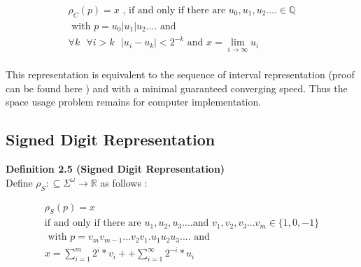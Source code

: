\documentclass[12pt,twoside,notitlepage]{report}
\begin{document}
\begin{equation}
\begin{split}
\rho _{\textit{C}} (p) = \textit{x} \mbox{ , if and only if there are }u_{0} , u_{1} , u_{2} .... \in \mathbb{Q} \\
\mbox{ with } p = u_{0}|u_{1}|u_{2}....  \mbox{ and } \\
\forall k \mbox{ } \forall \textit{i} >k \mbox{ } |u_{\textit{i}}-u_{\textit{k}}| < 2^{-k} \mbox{ and } \textit{x} = \lim_{\textit{i}\to\infty} u_{\textit{i}} 
\end{split}
\end{equation}\\
This representation is equivalent to the sequence of interval representation (proof can be found here \cite{weihrauchd}) and with a minimal guaranteed converging speed. Thus the space usage problem remains for computer implementation. 


\subsection {Signed Digit Representation}
\textbf{Definition 2.5 (Signed Digit Representation)}\cite{weihrauchd}\\
Define $\rho _{\textit{S}}: \subseteq \Sigma^{\omega} \rightarrow \mathbb{R}$ as follows :

\begin{equation}
\begin{split}
\rho _{\textit{S}} (p) = \textit{x} \\
\mbox{if and only if there are } u_{1} , u_{2} , u_{3}.... \mbox{and } v_{1} , v_{2} , v_{3} ...v_{m} \in \{1,0,-1\}  \\
\mbox{ with } p = v_{m}v_{m-1}...v_{2}v_{1}.u_{1}u_{2}u_{3}....  \mbox{ and } \\
\textit{x} = \sum_{i=1}^{m} 2^i*v_{i} +  + \sum_{i=1}^{\infty} 2^{-i}*u_{i} 
\end{split}
\end{equation}\\
\end{document}
